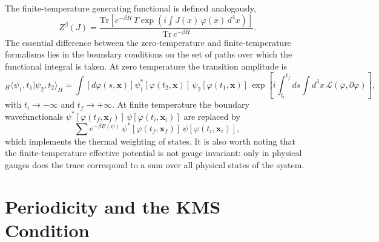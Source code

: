 The finite-temperature generating functional is defined analogously,
\begin{equation}
	Z^\beta(J) = \frac{\mathrm{Tr}\left[e^{-\beta H}\,
			T\exp\!\left(i\int J(x)\,\varphi(x)\,d^4x\right)\right]}
	{\mathrm{Tr}\,e^{-\beta H}}.
\end{equation}
The essential difference between the zero-temperature and
finite-temperature formalisms lies in the boundary conditions on the
set of paths over which the functional integral is taken. At zero
temperature the transition amplitude is
\begin{equation}
	{}_H\langle\psi_1,t_1|\psi_2,t_2\rangle_H
	= \int\left[d\varphi(s,\mathbf{x})\right]
	\psi_1^*[\varphi(t_2,\mathbf{x})]\,\psi_2[\varphi(t_1,\mathbf{x})]\,
	\exp\!\left[i\int_{t_i}^{t_f}ds\int d^3x\,
		\mathcal{L}(\varphi,\partial\varphi)\right],
\end{equation}
with $t_i\to-\infty$ and $t_f\to+\infty$. At finite temperature the
boundary wavefunctionals $\psi^*[\varphi(t_f,\mathbf{x}_f)]\,
	\psi[\varphi(t_i,\mathbf{x}_i)]$ are replaced by
\begin{equation}
	\sum e^{-\beta E(\psi)}\,\psi^*[\varphi(t_f,\mathbf{x}_f)]\,
	\psi[\varphi(t_i,\mathbf{x}_i)],
\end{equation}
which implements the thermal weighting of states. It is also worth noting
that the finite-temperature effective potential is not gauge invariant:
only in physical gauges does the trace correspond to a sum over all
physical states of the system.

\section{Periodicity and the KMS Condition}

